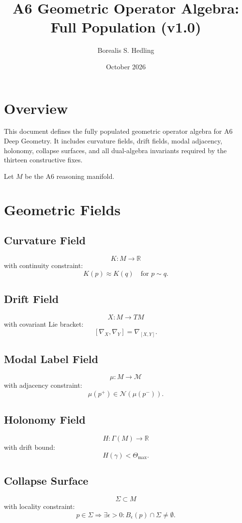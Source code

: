 \documentclass[11pt]{article}
\title{A6 Geometric Operator Algebra: Full Population (v1.0)}
\author{Borealis S. Hedling}
\date{October 2026}
\begin{document}
\maketitle

\section*{Overview}

This document defines the fully populated geometric operator algebra for A6
Deep Geometry. It includes curvature fields, drift fields, modal adjacency,
holonomy, collapse surfaces, and all dual-algebra invariants required by the
thirteen constructive fixes.

Let $M$ be the A6 reasoning manifold.

\section{Geometric Fields}

\subsection{Curvature Field}
\[
K : M \to \mathbb{R}
\]
with continuity constraint:
\[
K(p) \approx K(q) \quad \text{for } p \sim q.
\]

\subsection{Drift Field}
\[
X : M \to TM
\]
with covariant Lie bracket:
\[
[\nabla_X, \nabla_Y] = \nabla_{[X,Y]}.
\]

\subsection{Modal Label Field}
\[
\mu : M \to \mathcal{M}
\]
with adjacency constraint:
\[
\mu(p^+) \in \mathcal{N}(\mu(p^-)).
\]

\subsection{Holonomy Field}
\[
H : \Gamma(M) \to \mathbb{R}
\]
with drift bound:
\[
H(\gamma) < \Theta_{\max}.
\]

\subsection{Collapse Surface}
\[
\Sigma \subset M
\]
with locality constraint:
\[
p \in \Sigma \Rightarrow \exists \epsilon > 0 : B_\epsilon(p) \cap \Sigma \neq \emptyset.
\]
\end{document}
